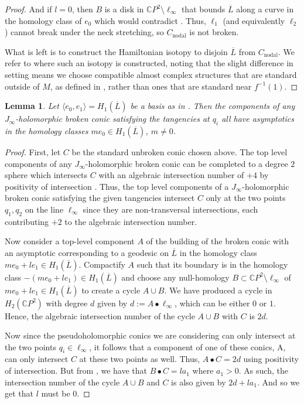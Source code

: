\documentclass[10pt]{amsart}
\theoremstyle{plain}
\newtheorem{lemma}[thm]{Lemma}
\theoremstyle{definition}
\numberwithin{equation}{section}
\newcommand{\C}{\mathbb{C}}
\newcommand{\sm}{\setminus}
\begin{document}
\begin{proof}
    And if $l=0$, then $B$ is a disk in $\C P^2 \sm \ell_\infty$ that bounds $\overline{L}$ along a curve in the homology class of $e_0$ which would contradict . Thus, $\ell_1$ (and equivalently $\ell_2$) cannot break under the neck stretching, so $C_\text{nodal}$ is not broken.

    What is left is to construct the Hamiltonian isotopy to disjoin $\overline{L}$ from $C_\text{nodal}$. We refer to \cite[Lemma 5.7]{DR19_WhitneySphere} where such an isotopy is constructed, noting that the slight difference in setting means we choose compatible almost complex structures that are standard outside of $M$, as defined in , rather than ones that are standard near $f^{-1}(1)$.
\end{proof}



\begin{lemma}\label{lem:e_0asymptotics}
    Let $\langle e_0, e_1\rangle = H_1(\overline{L})$ be a basis as in . Then the components of any $J_\infty$-holomorphic broken conic satisfying the tangencies at $q_i$ all have asymptotics in the homology classes $m e_0\in H_1(\overline{L})$, $m\neq 0$.
\end{lemma}

\begin{proof}
    First, let $C$ be the standard unbroken conic chosen above. The top level components of any $J_\infty$-holomorphic broken conic can be completed to a degree $2$ sphere which intersects $C$ with an algebraic intersection number of $+4$ by positivity of intersection \cite{McDuff91_Pos_of_int}. Thus, the top level components of a $J_\infty$-holomorphic broken conic satisfying the given tangencies intersect $C$ only at the two points $q_1,q_2$ on the line $\ell_\infty$ since they are non-transversal intersections, each contributing $+2$ to the algebraic intersection number.

    Now consider a top-level component $A$ of the building of the broken conic with an asymptotic corresponding to a geodesic on $\overline{L}$ in the homology class $me_0+ le_1 \in H_1(\overline{L})$. Compactify $A$ such that its boundary is in the homology class $-(me_0+le_1)\in H_1(\overline{L})$ and choose any null-homology $B\subset \C P^2 \sm \ell_\infty$ of $me_0+le_1\in H_1(\overline{L})$ to create a cycle $A\cup B$. We have produced a cycle in $H_2(\C P^2)$ with degree $d$ given by $d:=A\bullet \ell_\infty$, which can be either $0$ or $1$. Hence, the algebraic intersection number of the cycle $A\cup B$ with $C$ is $2d$. 
    
    Now since the pseudoholomorphic conics we are considering can only intersect at the two points $q_i\in \ell_\infty$, it follows that a component of one of these conics, A, can only intersect $C$ at these two points as well. Thus, $A\bullet C=2d$ using positivity of intersection. But from , we have that $B\bullet C = la_1$ where $a_1>0$. As such, the intersection number of the cycle $A\cup B$ and $C$ is also given by $2d+la_1$. And so we get that $l$ must be $0$.
\end{proof}
\end{document}
